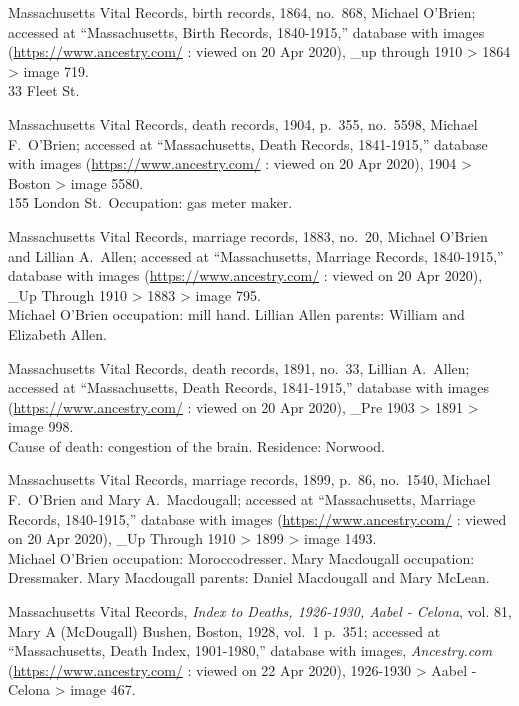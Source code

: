 \begin{thebibliography}{999}
	Massachusetts Vital Records, birth records, 1864, no.\ 868, Michael O'Brien; accessed at ``Massachusetts, Birth Records, 1840-1915,'' database with images (\url{https://www.ancestry.com/} : viewed on 20 Apr 2020), \_up through 1910 > 1864 > image 719.\\
	33 Fleet St.
	
	Massachusetts Vital Records, death records, 1904, p.\ 355, no.\ 5598, Michael F.\ O'Brien; accessed at ``Massachusetts, Death Records, 1841-1915,'' database with images (\url{https://www.ancestry.com/} : viewed on 20 Apr 2020), 1904 > Boston > image 5580.\\
	155 London St.\ Occupation: gas meter maker.
	
	Massachusetts Vital Records, marriage records, 1883, no.\ 20, Michael O'Brien and Lillian A.\ Allen; accessed at ``Massachusetts, Marriage Records, 1840-1915,'' database with images (\url{https://www.ancestry.com/} : viewed on 20 Apr 2020), \_Up Through 1910 > 1883 > image 795.\\
	Michael O'Brien occupation: mill hand. Lillian Allen parents: William and Elizabeth Allen.
	
	Massachusetts Vital Records, death records, 1891, no.\ 33, Lillian A.\ Allen; accessed at ``Massachusetts, Death Records, 1841-1915,'' database with images (\url{https://www.ancestry.com/} : viewed on 20 Apr 2020), \_Pre 1903 > 1891 > image 998.\\
	Cause of death: congestion of the brain. Residence: Norwood.
	
	Massachusetts Vital Records, marriage records, 1899, p.\ 86, no.\ 1540, Michael F.\ O'Brien and Mary A.\ Macdougall; accessed at ``Massachusetts, Marriage Records, 1840-1915,'' database with images (\url{https://www.ancestry.com/} : viewed on 20 Apr 2020), \_Up Through 1910 > 1899 > image 1493.\\
	Michael O'Brien occupation: Moroccodresser. Mary Macdougall occupation: Dressmaker. Mary Macdougall parents: Daniel Macdougall and Mary McLean.
	
	Massachusetts Vital Records, \textit{Index to Deaths, 1926-1930, Aabel - Celona}, vol. 81, Mary A (McDougall) Bushen, Boston, 1928, vol.\ 1 p.\ 351; accessed at ``Massachusetts, Death Index, 1901-1980,'' database with images, \textit{Ancestry.com} (\url{https://www.ancestry.com/} : viewed on 22 Apr 2020), 1926-1930 > Aabel - Celona > image 467.
	

\end{thebibliography}
